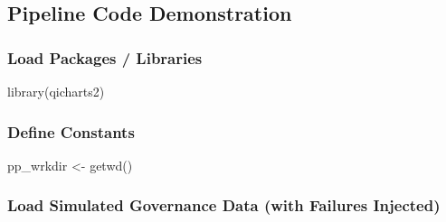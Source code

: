 \documentclass[
]{article}
\newenvironment{Shaded}{\begin{snugshade}}{\end{snugshade}}
\newcommand{\FunctionTok}[1]{\textcolor[rgb]{0.00,0.00,0.00}{#1}}
\newcommand{\NormalTok}[1]{#1}
\newcommand{\OtherTok}[1]{\textcolor[rgb]{0.56,0.35,0.01}{#1}}
\begin{document}
\hypertarget{pipeline-code-demonstration}{%
\subsection{Pipeline Code
Demonstration}\label{pipeline-code-demonstration}}

\hypertarget{load-packages-libraries}{%
\subsubsection{Load Packages /
Libraries}\label{load-packages-libraries}}

\begin{Shaded}
\begin{Highlighting}[]
\FunctionTok{library}\NormalTok{(qicharts2)}
\end{Highlighting}
\end{Shaded}

\hypertarget{define-constants}{%
\subsubsection{Define Constants}\label{define-constants}}

\begin{Shaded}
\begin{Highlighting}[]
\NormalTok{pp\_wrkdir }\OtherTok{\textless{}{-}} \FunctionTok{getwd}\NormalTok{()}
\end{Highlighting}
\end{Shaded}

\hypertarget{load-simulated-governance-data-with-failures-injected}{%
\subsubsection{Load Simulated Governance Data (with Failures
Injected)}\label{load-simulated-governance-data-with-failures-injected}}
\end{document}
